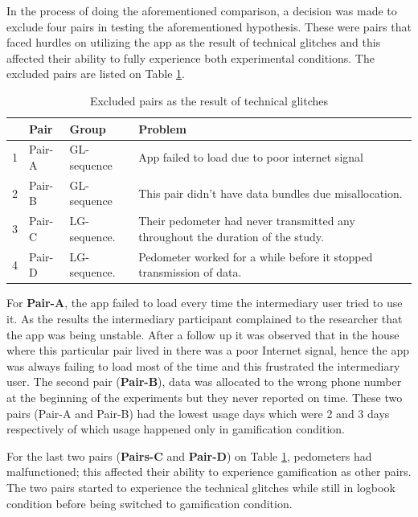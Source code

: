 In the process of doing the aforementioned comparison, a decision was made to exclude four pairs in testing the aforementioned hypothesis. These were pairs that faced hurdles on utilizing the app as the result of technical glitches and this affected their ability to fully experience both experimental conditions. The excluded pairs are listed on Table \ref{table:usageproblems}.

\begin{table}[h!]
  \begin{center}
    \caption{Excluded pairs as the result of technical glitches}
    \label{table:usageproblems}
	\begin{tabular}{|l|l|l|p{6cm}|}
		\hline
		&Pair&Group&Problem\\
		\hline
		1&Pair-A&GL-sequence &App failed to load due to poor internet signal\\
		\hline
		2&Pair-B&GL-sequence&This pair didn't have data bundles due misallocation. \\
		\hline
		3&Pair-C & LG-sequence.& Their pedometer had never transmitted any throughout the duration of the study.\\
		\hline
		4&Pair-D & LG-sequence.& Pedometer worked for a while before it stopped transmission of data.\\
	\hline
	\end{tabular}
  \end{center}
\end{table}

For \textbf{Pair-A}, the app failed to load every time the intermediary user tried to use it. As the results the intermediary participant complained to the researcher that the app was being unstable. After a follow up it was observed that in the house where this particular pair lived in there was a poor Internet signal, hence the app was always failing to load most of the time and this frustrated the intermediary user. The second pair (\textbf{Pair-B}), data was allocated to the wrong phone number at the beginning of the experiments but they never reported on time. These two pairs (Pair-A and Pair-B) had the lowest usage days which were 2 and 3 days respectively of which usage happened only in gamification condition.

For the last two pairs (\textbf{Pairs-C} and \textbf{Pair-D}) on Table \ref{table:usageproblems}, pedometers had malfunctioned; this affected their ability to experience gamification as other pairs. The two pairs started to experience the technical glitches while still in logbook condition before being switched to gamification condition.

